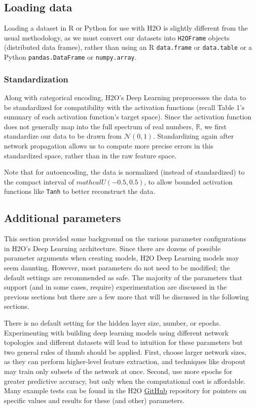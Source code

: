 \subsection{Loading data} 

Loading a dataset in R or Python for use with H2O is slightly different from the usual methodology, as we must convert our datasets into \texttt{H2OFrame} objects (distributed data frames), rather than using an R \texttt{data.frame} or \texttt{data.table} or a Python \texttt{pandas.DataFrame} or \texttt{numpy.array}. 

\subsubsection{Standardization} 

Along with categorical encoding, H2O's Deep Learning preprocesses the data to be standardized for compatibility with the activation functions (recall Table 1's summary of each activation function's target space). Since the activation function does not generally map into the full spectrum of real numbers, $\mathbb{R}$, we first standardize our data to be drawn from $\mathcal{N}(0,1)$. Standardizing again after network propagation allows us to compute more precise errors in this standardized space, rather than in the raw feature space. 

Note that for autoencoding, the data is normalized (instead of standardized) to the compact interval of $mathcal{U}(-0.5,0.5)$, to allow bounded activation functions like \texttt{Tanh} to better reconstruct the data.


\subsection{Additional parameters} 

This section provided some background on the various parameter configurations in H2O's Deep Learning architecture. Since there are dozens of possible parameter arguments when creating models, H2O Deep Learning models may seem daunting. However, most parameters do not need to be modified; the default settings are recommended as safe. The majority of the parameters that support (and in some cases, require) experimentation are discussed in the previous sections but there are a few more that will be discussed in the following sections. 

There is no default setting for the hidden layer size, number, or epochs. Experimenting with building deep learning models using different network topologies and different datasets will lead to intuition for these parameters but two general rules of thumb should be applied. First, choose larger network sizes, as they can perform higher-level feature extraction, and techniques like dropout may train only subsets of the network at once. Second, use more epochs for greater predictive accuracy, but only when the computational cost is affordable. Many example tests can be found in the H2O \href{https://github.com/h2oai/h2o-3/}{GitHub} repository for pointers on specific values and results for these (and other) parameters.

